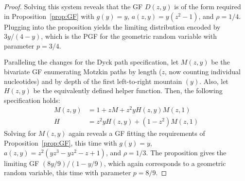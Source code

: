 \documentclass[10pt,a4paper]{amsart}
\begin{document}
\begin{proof}
    Solving this system reveals that the GF $D(z, y)$ is of the form required in Proposition~\ref{prop:GF} with $g(y) = y$, $a(z, y) = y(z^2 - 1)$, and $\rho = 1/4$.  Plugging into the proposition yields the limiting distribution encoded by $3y/(4-y)$, which is the PGF for the geometric random variable with parameter $p = 3/4$.
   
    Paralleling the changes for the Dyck path specification, let $M(z, y)$ be the bivariate GF enumerating Motzkin paths by length ($z$, now counting individual nucleotides) and by depth of the first left-to-right mountain $(y)$.  Also, let $H(z, y)$ be the equivalently defined helper function.  Then, the following specification holds:
    \begin{align*}
    M(z, y) &= 1 + zM + z^2yH(z, y)M(z, 1)\\
    H &= z^2yH(z, y) + (1-z^2)M(z, 1)
    \end{align*}
    Solving for $M(z, y)$ again reveals a GF fitting the requirements of Proposition~\ref{prop:GF}, this time with $g(y) = y$, $a(z, y) = z^2(yz^3 - yz^2 - z + 1)$, and $\rho = 1/3$.  The proposition gives the limiting GF $(8y/9)/(1-y/9)$,
    which again corresponds to a geometric random variable, this time with parameter $p = 8/9$.


\end{proof}
\end{document}
